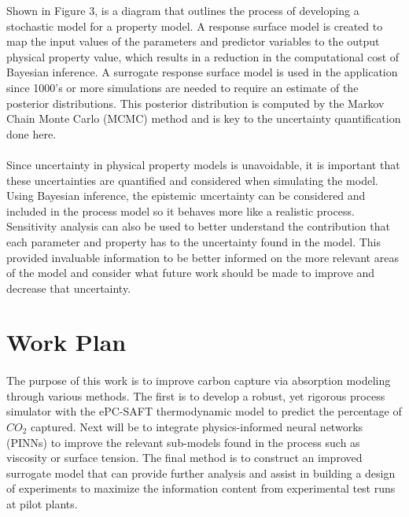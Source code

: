 \documentclass[12pt, letterpaper]{article}
\begin{document}
Shown in Figure 3, is a diagram that outlines the process of developing a stochastic model for a property model. A response surface model is created to map the input values of the parameters and predictor variables to the output physical property value, which results in a reduction in the computational cost of Bayesian inference.  A surrogate response surface model is used in the application since 1000's or more simulations are needed to require an estimate of the posterior distributions. This posterior distribution is computed by the Markov Chain Monte Carlo (MCMC) method and is key to the uncertainty quantification done here.

\paragraph{}
Since uncertainty in physical property models is unavoidable, it is important that these uncertainties are quantified and considered when simulating the model.  Using Bayesian inference, the epistemic uncertainty can be considered and included in the process model so it behaves more like a realistic process.  Sensitivity analysis can also be used to better understand the contribution that each parameter and property has to the uncertainty found in the model.  This provided invaluable information to be better informed on the more relevant areas of the model and consider what future work should be made to improve and decrease that uncertainty.

\section{Work Plan}

\paragraph{}
The purpose of this work is to improve carbon capture via absorption modeling through various methods. The first is to develop a robust, yet rigorous process simulator with the ePC-SAFT thermodynamic model to predict the percentage of $CO_2$ captured. Next will be to integrate physics-informed neural networks (PINNs) to improve the relevant sub-models found in the process such as viscosity or surface tension.  The final method is to construct an improved surrogate model that can provide further analysis and assist in building a design of experiments to maximize the information content from experimental test runs at pilot plants.  
\end{document}
